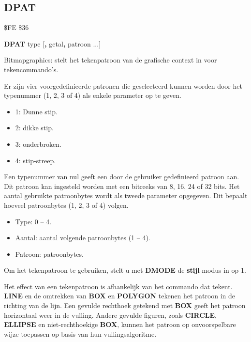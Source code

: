 \subsection{DPAT}
\begin{description}[leftmargin=2cm,style=nextline]
\item [Token:]    \$FE \$36

\item [Formaat:]   {\bf DPAT} type [{\bf,} getal{\bf,} patroon ...]

\item [Gebruik:]    Bitmapgraphics: stelt het tekenpatroon van de grafische context in voor tekencommando's.

                  Er zijn vier voorgedefinieerde patronen die geselecteerd kunnen worden door het typenummer (1, 2, 3 of 4) als enkele parameter op te geven.

                  \begin{itemize}
                     \item 1: Dunne stip.                     \item 2: dikke stip.                     \item 3: onderbroken.                     \item 4: stip-streep.
                  \end{itemize}

                  Een typenummer van nul geeft een door de gebruiker gedefinieerd patroon aan. Dit patroon kan ingesteld worden met een bitreeks van 8, 16, 24 of 32 bits. Het aantal gebruikte patroonbytes wordt als tweede parameter opgegeven. Dit bepaalt hoeveel patroonbytes (1, 2, 3 of 4) volgen.

                  \begin{itemize}
                     \item Type: 0 -- 4.                     \item Aantal: aantal volgende patroonbytes (1 -- 4).                     \item Patroon: patroonbytes.
                  \end{itemize}

\item[Opmerkingen:]   Om het tekenpatroon te gebruiken, stelt u met {\bf DMODE} de {\bf stijl}-modus in op 1.

                  Het effect van een tekenpatroon is afhankelijk van het commando dat tekent. {\bf LINE} en de omtrekken van {\bf BOX} en {\bf POLYGON} tekenen het patroon in de richting van de lijn. Een gevulde rechthoek getekend met {\bf BOX} geeft het patroon horizontaal weer in de vulling. Andere gevulde figuren, zoals {\bf CIRCLE}, {\bf ELLIPSE} en niet-rechthoekige {\bf BOX}, kunnen het patroon op onvoorspelbare wijze toepassen op basis van hun vullingsalgoritme.


\end{description}
